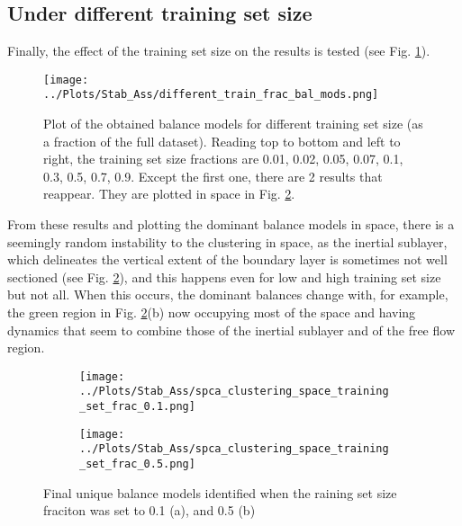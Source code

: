 \documentclass[12pt]{report} %
\begin{document}
\subsection{Under different training set size}

Finally, the effect of the training set size on the results is tested (see Fig. \ref{fig:diff_train_frac_bal_mods}).

\begin{figure}[htbp]
  \centering
  \texttt{[image: ../Plots/Stab\_Ass/different\_train\_frac\_bal\_mods.png]}
  \caption{Plot of the obtained balance models for different training set size (as a fraction of the full dataset). Reading top to bottom and left to right, the training set size fractions are 0.01, 0.02, 0.05, 0.07, 0.1, 0.3, 0.5, 0.7, 0.9. Except the first one, there are 2 results that reappear. They are plotted in space in Fig. \ref{fig:diff_train_frac_clustering}.}
  \label{fig:diff_train_frac_bal_mods}
\end{figure}

From these results and plotting the dominant balance models in space, there is a seemingly random instability to the clustering in space, as the inertial sublayer, which delineates the vertical extent of the boundary layer is sometimes not well sectioned (see Fig. \ref{fig:diff_train_frac_clustering}), and this happens even for low and high training set size but not all. When this occurs, the dominant balances change with, for example, the green region in Fig. \ref{fig:diff_train_frac_clustering}(b) now occupying most of the space and having dynamics that seem to combine those of the inertial sublayer and of the free flow region.

\begin{figure}[htbp]
  \centering
  \begin{subfigure}[b]{0.7\textwidth}
    \texttt{[image: ../Plots/Stab\_Ass/spca\_clustering\_space\_training\_set\_frac\_0.1.png]}
    \caption{}
  \end{subfigure}
  \begin{subfigure}[b]{0.7\textwidth}
      \texttt{[image: ../Plots/Stab\_Ass/spca\_clustering\_space\_training\_set\_frac\_0.5.png]}
      \caption{}
  \end{subfigure}

  \caption{Final unique balance models identified when the raining set size fraciton was set to 0.1 (a), and 0.5 (b)}
  \label{fig:diff_train_frac_clustering}
\end{figure}
\end{document}

